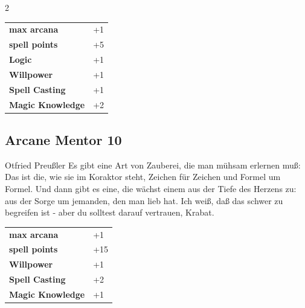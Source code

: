 \begin{multicols}{2}
\begin{tcolorbox}
\begin{tabular}{@{}ll@{}}
    \textbf{max arcana} & +1\\
    \textbf{spell points} & +5\\
    \textbf{Logic} & +1\\
    \textbf{Willpower} & +1\\
    \textbf{Spell Casting} & +1\\
    \textbf{Magic Knowledge} & +2\\
\end{tabular}


\end{tcolorbox}

\begin{tcolorbox}
    \subsection*{Arcane Mentor \hfill \small{10 }}
    \tcblower


\begin{pquote}{Otfried Preußler}
Es gibt eine Art von Zauberei, die man mühsam erlernen muß: Das ist die, wie sie im Koraktor steht, Zeichen für Zeichen und Formel um Formel. Und dann gibt es eine, die wächst einem aus der Tiefe des Herzens zu: aus der Sorge um jemanden, den man lieb hat. Ich weiß, daß das schwer zu begreifen ist - aber du solltest darauf vertrauen, Krabat.
\end{pquote}

\vspace{3mm}

\begin{tabular}{@{}ll@{}}
    \textbf{max arcana} & +1\\
    \textbf{spell points} & +15\\
    \textbf{Willpower} & +1\\
    \textbf{Spell Casting} & +2\\
    \textbf{Magic Knowledge} & +1\\
\end{tabular}


\end{tcolorbox}


\end{multicols}
